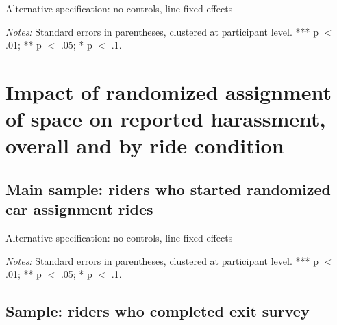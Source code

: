 \documentclass[12pt]{article}
\begin{document}
\begin{table}[H]
	\centering
	\caption{Alternative specification: no controls, line fixed effects }
	\begin{adjustbox}{max width = .5\textwidth}
		\begin{threeparttable}
			
			\begin{tablenotes}
				\item  \footnotesize\textit{Notes:} Standard errors in parentheses, clustered at participant level. *** p $<$ .01; ** p $<$ .05; * p $<$ .1.
			\end{tablenotes}
		\end{threeparttable}
	\end{adjustbox}
\end{table}

\section{Impact of randomized assignment of space on reported harassment, overall and by ride condition}

\subsection{Main sample: riders who started randomized car assignment rides}

\begin{table}[H]
    \centering
	\caption{Alternative specification: no controls, line fixed effects }
	\begin{adjustbox}{max width = \textwidth}
		\begin{threeparttable}
			
		\begin{tablenotes}
			\item  \footnotesize\textit{Notes:} Standard errors in parentheses, clustered at participant level. *** p $<$ .01; ** p $<$ .05; * p $<$ .1.
		\end{tablenotes}
		\end{threeparttable}
	\end{adjustbox}
\end{table}

\subsection{Sample: riders who completed exit survey}
\end{document}
